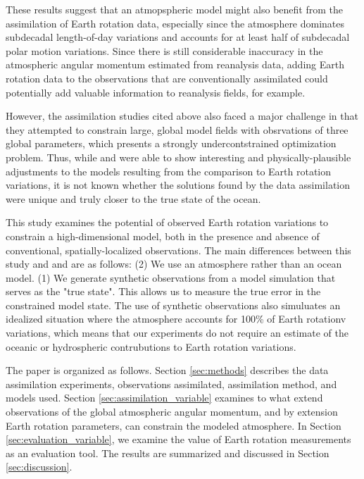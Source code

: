 These results suggest that an atmopspheric model might also benefit from the assimilation of Earth rotation data, especially since the atmosphere dominates subdecadal length-of-day variations and accounts for at least half of subdecadal polar motion variations. 
Since there is still considerable inaccuracy in the atmospheric angular momentum estimated from reanalysis data, adding Earth rotation data to the observations that are conventionally assimilated could potentially add valuable information to reanalysis fields, for example. 

However, the assimilation studies cited above also faced a major challenge in that they attempted to constrain large, global model fields with obsrvations of three global parameters, which presents a strongly undercontstrained optimization problem. 
Thus, while \citet{Saynisch2010,Saynisch2011} and \citet{Saynisch2012} were able to show interesting and physically-plausible adjustments to the models resulting from the comparison to Earth rotation variations, it is not known whether the solutions found by the data assimilation were unique and truly closer to the true state of the ocean.  

This study examines the potential of observed Earth rotation variations to constrain a high-dimensional model, both in the presence and absence of conventional, spatially-localized observations. 
The main differences between this study and \citet{Saynisch2010,Saynisch2011} and \citet{Saynisch2012} are as follows: 
(2) We use an atmosphere rather than an ocean model.
(1) We generate synthetic observations from a model simulation that serves as the "true state". This allows us to measure the true error in the constrained model state. The use of synthetic observations also simuluates an idealized situation where the atmosphere accounts for 100\% of Earth rotationv variations, which means that our experiments do not require an estimate of the oceanic or hydrospheric contrubutions to Earth rotation variations.  


The paper is organized as follows.  
Section \ref{sec:methods} describes the data assimilation experiments, observations assimilated, assimilation method, and models used.
Section \ref{sec:assimilation_variable} examines to what extend observations of the global atmospheric angular momentum, and by extension Earth rotation parameters, can constrain the modeled atmosphere. 
In Section \ref{sec:evaluation_variable}, we examine the value of Earth rotation measurements as an evaluation tool.  
The results are summarized and discussed in Section \ref{sec:discussion}.

